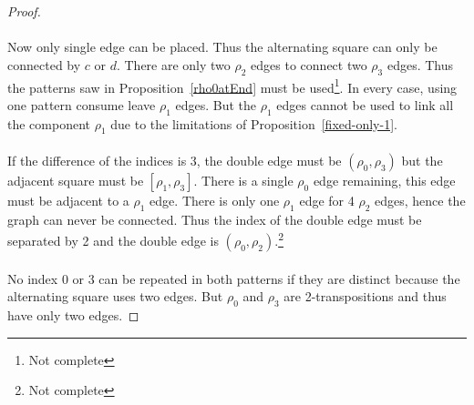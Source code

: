 \begin{proof}
\begin{figure}[H]
\begin{center}
      \caption{}
    \end{center}
  \end{figure}

  \paragraph{}
  Now only single edge can be placed. Thus the alternating square can only be connected by $c$ or $d$. There are only two $\rho_2$ edges to connect two $\rho_3$ edges. Thus the patterns saw in Proposition~\ref{rho0atEnd} must be used\footnote{Not complete}. In every case, using one pattern consume leave $\rho_1$ edges. But the $\rho_1$ edges cannot be used to link all the component $\rho_1$ due to the limitations of Proposition~\ref{fixed-only-1}.

  \paragraph{}
  If the difference of the indices is 3, the double edge must be $(\rho_0, \rho_3)$ but the adjacent square must be $[\rho_1, \rho_3]$. There is a single $\rho_0$ edge remaining, this edge must be adjacent to a $\rho_1$ edge. There is only one $\rho_1$ edge for 4 $\rho_2$ edges, hence the graph can never be connected. Thus the index of the double edge must be separated by 2 and the double edge is $(\rho_0, \rho_2)$.\footnote{Not complete}

  \paragraph{}
  No index 0 or 3 can be repeated in both patterns if they are distinct because the alternating square uses two edges. But $\rho_0$ and $\rho_3$ are 2-transpositions and thus have only two edges.

\end{proof}

